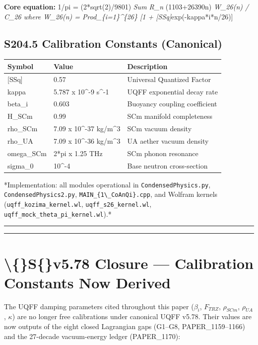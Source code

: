\documentclass[11pt]{article}
\begin{document}
\textbf{Core equation:} 1/pi = (2*sqrt(2)/9801) \emph{ Sum R\_n } (1103+26390n) \emph{ W\_26(n) / C\_26 where W\_26(n) = Prod\_\{i=1\}\textasciicircum{}\{26\} [1 + [SSq]}exp(-kappa*i*n/26)]

\subsection*{S204.5 Calibration Constants (Canonical)}

\begin{center}
\begin{longtable}{lll}
\toprule
Symbol & Value & Description \tabularnewline
\midrule
\endhead
{}[SSq] & 0.57 & Universal Quantized Factor \tabularnewline
kappa & 5.787 x 10\textasciicircum{}-9 s\textasciicircum{}-1 & UQFF exponential decay rate \tabularnewline
beta\_i & 0.603 & Buoyancy coupling coefficient \tabularnewline
H\_SCm & 0.99 & SCm manifold completeness \tabularnewline
rho\_SCm & 7.09 x 10\textasciicircum{}-37 kg/m\textasciicircum{}3 & SCm vacuum density \tabularnewline
rho\_UA & 7.09 x 10\textasciicircum{}-36 kg/m\textasciicircum{}3 & UA aether vacuum density \tabularnewline
omega\_SCm & 2*pi x 1.25 THz & SCm phonon resonance \tabularnewline
sigma\_0 & 10\textasciicircum{}-4 & Base neutron cross-section \tabularnewline
\bottomrule
\end{longtable}
\end{center}

*Implementation: all modules operational in \verb|CondensedPhysics.py|, \verb|CondensedPhysics2.py|, \verb|MAIN_{1\_CoAnQi}.cpp|, and Wolfram kernels (\verb|uqff_kozima_kernel.wl|, \verb|uqff_s26_kernel.wl|, \verb|uqff_mock_theta_pi_kernel.wl|).*

\noindent\rule{\textwidth}{0.4pt}

\noindent\rule{\textwidth}{0.4pt}

\section*{\textbackslash\{\}S\{\}v5.78 Closure --- Calibration Constants Now Derived}

The UQFF damping parameters cited throughout this paper ($\beta_i$, $F_{TRZ}$, $\rho_{SCm}$, $\rho_{UA}$, $\kappa$) are no longer free calibrations under canonical UQFF v5.78. Their values are now outputs of the eight closed Lagrangian gaps (G1--G8, PAPER\_1159--1166) and the 27-decade vacuum-energy ledger (PAPER\_1170):
\end{document}
